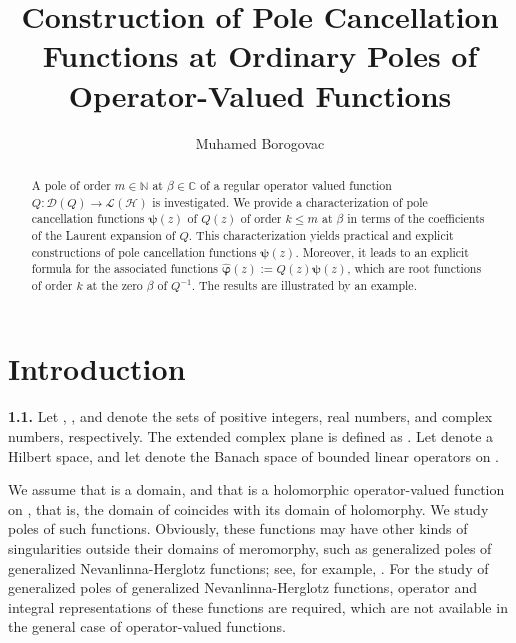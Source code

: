 \documentclass[11pt, reqno]{amsart}
\makeatletter
\theoremstyle{plain}
\theoremstyle{remark}
\newcounter{str}
\numberwithin{equation}{section}
\newcounter{mathrecordid}
\newcommand{\mathboxbegin}[1]{%
  \stepcounter{mathrecordid}%
  \immediate\write\mathrecords{\themathrecordid,#1}%
  \special{pdf:bann << /Type /Annot /Subtype /Link /Border [0 0 0]
    /MathBoxID \themathrecordid /F 2
    /A << /S /URI /URI (urn:mathbox:\themathrecordid) >> >>}}
\newcommand{\mathboxinlineplain}[1]{$#1$}
\newcommand{\mathboxinline}[1]{%
  $\mathboxbegin{inline}%
  \special{pdf:literal direct /MathBoxBegin\themathrecordid\space MP}%
  #1\special{pdf:literal direct /MathBoxEnd\themathrecordid\space MP}%
  \special{pdf:eann}$}
\newcommand{\recordmath}{%
  \ifmeasuring@\expandafter\mathboxinlineplain
  \else\expandafter\mathboxinline\fi}
\makeatother
\begin{document}
\title[Construction of Pole Cancellation Functions]{Construction of Pole Cancellation Functions at Ordinary Poles of Operator-Valued Functions}
\author{Muhamed Borogovac}

\begin{abstract} 
A pole of order $m \in \mathbb{N}$ at $\beta \in \mathbb{C}$ of a regular operator valued function $Q : \mathcal{D}(Q) \to \mathcal{L}(\mathcal{H})$ is investigated. We provide a characterization of pole cancellation functions $\boldsymbol{\psi}(z)$ of $Q(z)$ of order $k \le m$ at $\beta$ in terms of the coefficients of the Laurent expansion of $Q$. This characterization yields practical and explicit constructions of pole cancellation functions $\boldsymbol{\psi}(z)$. Moreover, it leads to an explicit formula for the associated functions $\boldsymbol{\hat{\varphi}}(z) := Q(z)\boldsymbol{\psi}(z)$, which are root functions of order $k$ at the zero $\beta$ of $Q^{-1}$. The results are illustrated by an example.
\end{abstract}


\maketitle
\thispagestyle{empty}
\section{Introduction}\label{s2}

\textbf{1.1.}  Let \recordmath{\mathbb{N}}, \recordmath{\mathbb{R}}, and \recordmath{\mathbb{C}} denote the sets of positive integers, real numbers, and complex numbers, respectively. The extended complex plane is defined as \recordmath{\bar{\mathbb{C}} := \mathbb{C} \cup \{\infty\}}. Let \recordmath{\mathcal{H}} denote a Hilbert space, and let \recordmath{\mathcal{L}(\mathcal{H})} denote the Banach space of bounded linear operators on \recordmath{\mathcal{H}}. %

We assume that \recordmath{\mathcal{D}(Q) \subseteq \mathbb{C}} is a domain, and that \recordmath{Q : \mathcal{D}(Q) \to \mathcal{L}(\mathcal{H})} is a holomorphic operator-valued function on \recordmath{\mathcal{D}(Q)}, that is, the domain of \recordmath{Q} coincides with its domain of holomorphy. We study poles of such functions. Obviously, these functions may have other kinds of singularities outside their domains of meromorphy, such as generalized poles of generalized Nevanlinna-Herglotz functions; see, for example, \cite{Lu3}. For the study of generalized poles of generalized Nevanlinna-Herglotz
functions, operator and integral representations of these functions are required, which are not available in the general case of operator-valued functions.
\end{document}
